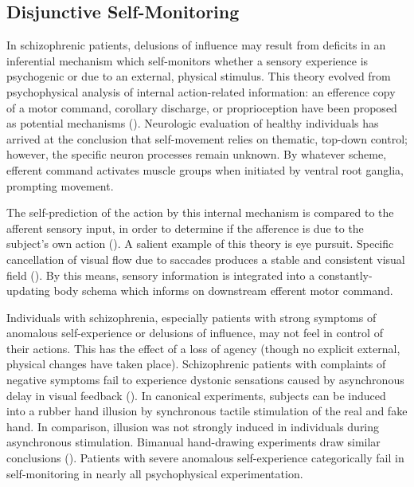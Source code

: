 \documentclass[]{article}
\begin{document}
	\subsection{Disjunctive Self-Monitoring}
		
		In schizophrenic patients, delusions of influence may result from deficits in an inferential mechanism which self-monitors whether a sensory experience is psychogenic or due to an external, physical stimulus. This theory evolved from psychophysical analysis of internal action-related information: an efference copy of a motor command, corollary discharge, or proprioception have been proposed as potential mechanisms (\cite{vonHolstPrincipleReafferenceInteractions1950,SperryNeuralbasisspontaneous1950}). Neurologic evaluation of healthy individuals has arrived at the conclusion that self-movement relies on thematic, top-down control; however, the specific neuron processes remain unknown. By whatever scheme, efferent command activates muscle groups when initiated by ventral root ganglia, prompting movement. 
		
		The self-prediction of the action by this internal mechanism is compared to the afferent sensory input, in order to determine if the afference is due to the subject’s own action (\cite{SynofzikInternalizingagencyselfaction2006,SynofzikMisattributionsagencyschizophrenia2010,Synofzikexperienceagencyinterplay2013}). A salient example of this theory is eye pursuit. Specific cancellation of visual flow due to saccades produces a stable and consistent visual field (\cite{HaarmeierEffectTMSOculomotor2010,TeufelDeficitssensoryprediction2010,GruolEssentialsCerebellumCerebellar2016}). By this means, sensory information is integrated into a constantly-updating body schema which informs on downstream efferent motor command.
		
		Individuals with schizophrenia, especially patients with strong symptoms of anomalous self-experience or delusions of influence, may not feel in control of their actions. This has the effect of a loss of agency (though no explicit external, physical changes have taken place). Schizophrenic patients with complaints of negative symptoms fail to experience dystonic sensations caused by asynchronous delay in visual feedback (\cite{GrahamNeuroscienceBiomechanicsRisks2014,MetcalfeJudgementsagencyschizophrenia2012}). In canonical experiments, subjects can be induced into a rubber hand illusion by synchronous tactile stimulation of the real and fake hand. In comparison, illusion was not strongly induced in individuals during asynchronous stimulation. Bimanual hand-drawing experiments draw similar conclusions (\cite{GarbariniAbnormalSenseAgency2016}). Patients with severe anomalous self-experience categorically fail in self-monitoring in nearly all psychophysical experimentation.
		
\end{document}
